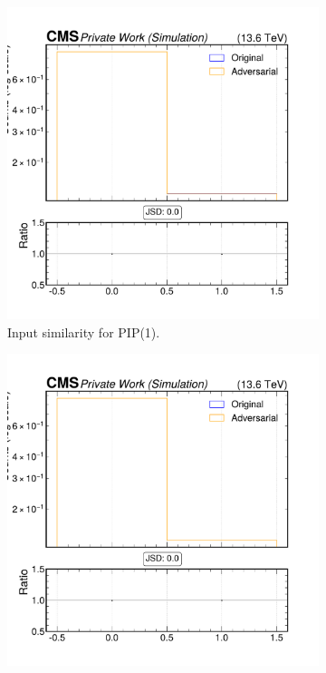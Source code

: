 \begin{figure}[h]
  \centering
  \begin{subfigure}[t]{0.32\textwidth}
    \includegraphics[width=\linewidth]{media/output/features/compare/intprob_1/cmp_npf_arr_Npfcan_isGamma.pdf}
    \caption{Input similarity for PIP(1).}
  \end{subfigure}\hfill
  \begin{subfigure}[t]{0.32\textwidth}
    \includegraphics[width=\linewidth]{media/output/features/compare/intprob_2/cmp_npf_arr_Npfcan_isGamma.pdf}

\end{subfigure}
\end{figure}
